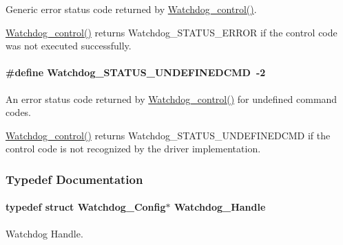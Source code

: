 Generic error status code returned by \hyperlink{_watchdog_8h_aa98a75361edb1e476432669169f2950e}{Watchdog\+\_\+control()}. 

\hyperlink{_watchdog_8h_aa98a75361edb1e476432669169f2950e}{Watchdog\+\_\+control()} returns Watchdog\+\_\+\+S\+T\+A\+T\+U\+S\+\_\+\+E\+R\+R\+O\+R if the control code was not executed successfully. 
\paragraph[{Watchdog\+\_\+\+S\+T\+A\+T\+U\+S\+\_\+\+U\+N\+D\+E\+F\+I\+N\+E\+D\+C\+M\+D}]{\setlength{\rightskip}{0pt plus 5cm}\#define Watchdog\+\_\+\+S\+T\+A\+T\+U\+S\+\_\+\+U\+N\+D\+E\+F\+I\+N\+E\+D\+C\+M\+D~-\/2}\label{_watchdog_8h_a589be79a7f8ce642863f231e1dae7577}


An error status code returned by \hyperlink{_watchdog_8h_aa98a75361edb1e476432669169f2950e}{Watchdog\+\_\+control()} for undefined command codes. 

\hyperlink{_watchdog_8h_aa98a75361edb1e476432669169f2950e}{Watchdog\+\_\+control()} returns Watchdog\+\_\+\+S\+T\+A\+T\+U\+S\+\_\+\+U\+N\+D\+E\+F\+I\+N\+E\+D\+C\+M\+D if the control code is not recognized by the driver implementation. 

\subsubsection{Typedef Documentation}
\paragraph[{Watchdog\+\_\+\+Handle}]{\setlength{\rightskip}{0pt plus 5cm}typedef struct {\bf Watchdog\+\_\+\+Config}$\ast$ {\bf Watchdog\+\_\+\+Handle}}\label{_watchdog_8h_a00ed22749c947ef200434eeec507f90d}


Watchdog Handle. 

